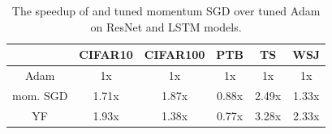 \vspace{-0.25em}
\begin{table}[h]
\centering
\small
	\begin{tabular}[t]{@{\hskip 0.5em}c@{\hskip 0.5em}|c@{\hskip 1em}c@{\hskip 1em}c@{\hskip 1em}c@{\hskip 1em}c@{\hskip 0.5em}}
		\toprule
		 & CIFAR10 & CIFAR100 & PTB & TS & WSJ \\
		\midrule
		\midrule
		Adam & 1x & 1x & 1x & 1x & 1x \\
		mom. SGD & 1.71x & 1.87x & 0.88x & 2.49x & 1.33x \\
		YF & 1.93x & 1.38x & 0.77x & 3.28x & 2.33x \\
		\bottomrule
	\end{tabular}
	\caption{
	The speedup of \tuner and tuned momentum SGD over tuned Adam on ResNet and LSTM models.
	}
	\label{tab:iters_to_loss}
\end{table}
\vspace{-0.5em}

